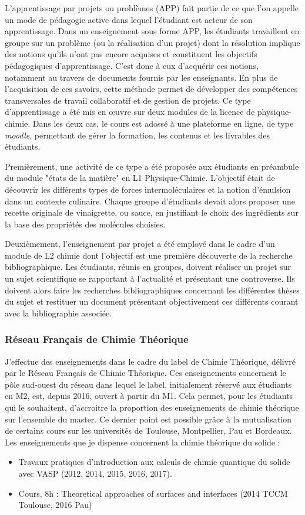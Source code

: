 \documentclass[11pt]{artuppax}
\newcounter{subsec}[section]
\begin{document}
L'apprentissage par projets ou problèmes (APP) fait partie de ce que l'on appelle un mode
de pédagogie active dans lequel l'étudiant est acteur de son apprentissage. Dans un
enseignement sous forme APP, les étudiants travaillent en groupe sur un
problème (ou la réalisation d'un projet) dont la résolution implique des
notions qu'ils n'ont pas encore acquises et constituent les objectifs pédagogiques d'apprentissage.
C'est donc à eux d'acquérir ces notions, notamment au travers de documents fournis par les
enseignants. En plus de l'acquisition de ces savoirs, cette méthode permet de développer des
compétences transversales de travail collaboratif et de gestion de projets.
Ce type d'apprentissage a été mis en œuvre sur deux modules de la licence
de physique-chimie. Dans les deux cas, le cours est adossé à une plateforme en ligne,
de type \textit{moodle}, permettant de gérer la formation, les contenus et les livrables
des étudiants.

Premièrement, une activité de ce type a été proposée aux étudiants en préambule du module
"états de la matière" en L1 Physique-Chimie.
L'objectif était de découvrir les différents types de forces intermoléculaires et la notion
d'émulsion dans un contexte culinaire. Chaque groupe d'étudiants devait alors proposer une
recette originale de vinaigrette, ou sauce, en justifiant le choix des ingrédients sur
la base des propriétés des molécules choisies.

Deuxièmement, l'enseignement par projet a été employé dans le cadre d'un module de L2
chimie dont l'objectif est une première découverte de la recherche bibliographique. Les
étudiants, réunis en groupes, doivent réaliser un projet sur un sujet scientifique se rapportant à
l'actualité et présentant une controverse. Ils doivent alors faire les recherches
bibliographiques concernant les différentes thèses du sujet et restituer un document
présentant objectivement ces différents courant avec la bibliographie associée.

\subsubsection{Réseau Français de Chimie Théorique}

J'effectue des enseignements dans le cadre du label de Chimie Théorique, délivré
par le Réseau Français de Chimie Théorique. Ces enseignements concernent le pôle
sud-ouest du réseau dans lequel le label, initialement réservé aux étudiants en
M2, est, depuis 2016, ouvert à partir du M1. Cela permet, pour les étudiants qui
le souhaitent, d'accroitre la proportion des enseignements de chimie théorique sur l'ensemble
du master. Ce dernier point est possible grâce à la mutualisation de certains cours
sur les universités de Toulouse, Montpellier, Pau et Bordeaux. Les enseignements
que je dispense concernent la chimie théorique du solide :
\begin{itemize}
    \item Travaux pratiques d'introduction aux calculs de chimie quantique du solide avec VASP (2012, 2014, 2015, 2016, 2017).
    \item Cours, 8h : Theoretical approaches of surfaces and interfaces (2014 TCCM Toulouse, 2016 Pau)
\end{itemize}
\end{document}
